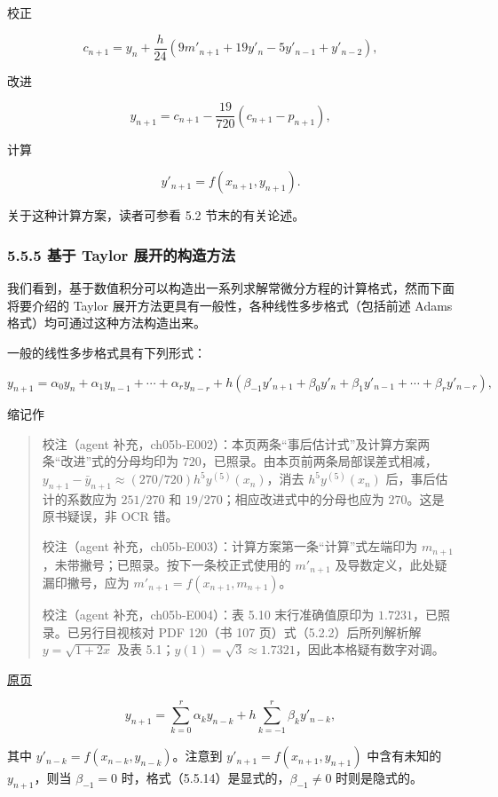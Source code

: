 \documentclass[
  10pt,
  fontset=fandol]{ctexart}
\begin{document}
校正

\[
c_{n+1}=y_n+\frac h{24}(9m'_{n+1}+19y'_n-5y'_{n-1}+y'_{n-2}),
\]

改进

\[
y_{n+1}=c_{n+1}-\frac{19}{720}(c_{n+1}-p_{n+1}),
\]

计算

\[
y'_{n+1}=f(x_{n+1},y_{n+1}).
\]

关于这种计算方案，读者可参看 5.2 节末的有关论述。

\subsubsection{5.5.5 基于 Taylor 展开的构造方法}\label{ux57faux4e8e-taylor-ux5c55ux5f00ux7684ux6784ux9020ux65b9ux6cd5}

我们看到，基于数值积分可以构造出一系列求解常微分方程的计算格式，然而下面将要介绍的 Taylor 展开方法更具有一般性，各种线性多步格式（包括前述 Adams 格式）均可通过这种方法构造出来。

一般的线性多步格式具有下列形式：

\[
y_{n+1}=\alpha_0y_n+\alpha_1y_{n-1}+\cdots+\alpha_ry_{n-r}+h(\beta_{-1}y'_{n+1}+\beta_0y'_n+\beta_1y'_{n-1}+\cdots+\beta_ry'_{n-r}),
\]

缩记作

\begin{quote}
校注（agent 补充，ch05b-E002）：本页两条``事后估计式''及计算方案两条``改进''式的分母均印为 \(720\)，已照录。由本页前两条局部误差式相减，\(y_{n+1}-\bar y_{n+1}\approx(270/720)h^5y^{(5)}(x_n)\)，消去 \(h^5y^{(5)}(x_n)\) 后，事后估计的系数应为 \(251/270\) 和 \(19/270\)；相应改进式中的分母也应为 \(270\)。这是原书疑误，非 OCR 错。

校注（agent 补充，ch05b-E003）：计算方案第一条``计算''式左端印为 \(m_{n+1}\)，未带撇号；已照录。按下一条校正式使用的 \(m'_{n+1}\) 及导数定义，此处疑漏印撇号，应为 \(m'_{n+1}=f(x_{n+1},m_{n+1})\)。

校注（agent 补充，ch05b-E004）：表 5.10 末行准确值原印为 \(1.7231\)，已照录。已另行目视核对 PDF 120（书 107 页）式（5.2.2）后所列解析解 \(y=\sqrt{1+2x}\) 及表 5.1；\(y(1)=\sqrt3\approx1.7321\)，因此本格疑有数字对调。
\end{quote}

\href{../../source-images/pdf-142.jpeg}{原页}

\[
y_{n+1}=\sum_{k=0}^r\alpha_ky_{n-k}+h\sum_{k=-1}^r\beta_ky'_{n-k},
\tag{5.5.14}
\]

其中 \(y'_{n-k}=f(x_{n-k},y_{n-k})\)。注意到 \(y'_{n+1}=f(x_{n+1},y_{n+1})\) 中含有未知的 \(y_{n+1}\)，则当 \(\beta_{-1}=0\) 时，格式（5.5.14）是显式的，\(\beta_{-1}\ne0\) 时则是隐式的。
\end{document}
